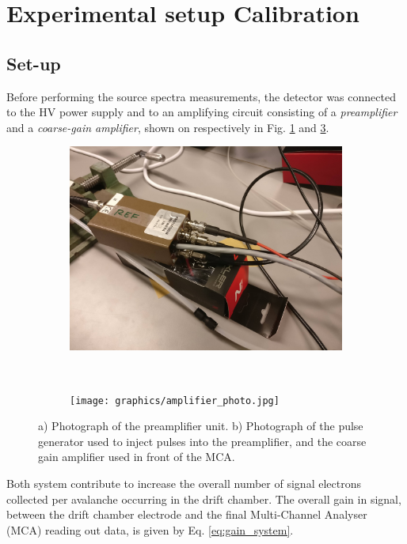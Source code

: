 \section{Experimental setup Cali\-bra\-ti\-on}

\subsection{Set-up}
\label{sec:calibration:set-up}
Before performing the source spectra measurements, the detector was connected to the HV power supply and to an amplifying circuit consisting of a \textit{preamplifier} and a \textit{coarse-gain amplifier}, shown on respectively in Fig. \ref{fig:preamp_photo} and \ref{fig:ampli_gene}. 

\begin{figure}[htb]
  \begin{subfigure}[b]{0.45\textwidth}
    \includegraphics[width=\textwidth]{graphics/preamplifier.jpg}
    \caption{}
    \label{fig:preamp_photo}
  \end{subfigure}
  ~
  \begin{subfigure}[b]{0.45\textwidth}
    \texttt{[image: graphics/amplifier\_photo.jpg]}
    \caption{}
    \label{fig:ampli_gene}
  \end{subfigure}
  \caption{a) Photograph of the preamplifier unit. b) Photograph of the pulse generator used to inject pulses into the preamplifier, and the coarse gain amplifier used in front of the MCA.}
\end{figure}

Both system contribute to increase the overall number of signal electrons collected per avalanche occurring in the drift chamber. The overall gain in signal, between the drift chamber electrode and the final Multi-Channel Analyser (MCA) reading out data, is given by Eq. \ref{eq:gain_system}.

